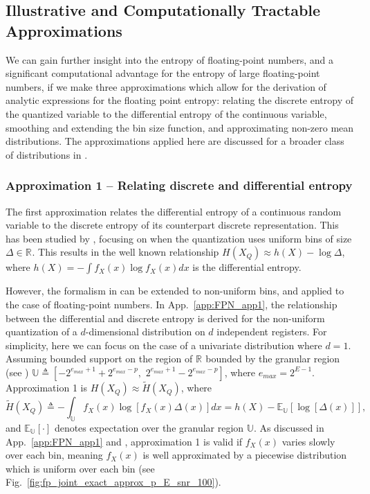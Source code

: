 \documentclass[12pt,onecolumn, margin=1in]{IEEEtran}
\newcommand{\R}[1]{\mathbb{R}^{#1}}
\newcommand{\Esub}[2]{\mathbb{E}_{#2}\left[ #1 \right]}
\begin{document}
\subsection{Illustrative and Computationally Tractable Approximations}\label{sec:illustrative_approx}

We can gain further insight into the entropy of floating-point numbers, and a significant computational advantage for the entropy of large floating-point numbers, if we make three approximations which allow for the derivation of analytic expressions for the floating point entropy: relating the discrete entropy of the quantized variable to the differential entropy of the continuous variable, smoothing and extending the bin size function, and approximating non-zero mean distributions. The approximations applied here are discussed for a broader class of distributions in \cite{daniels2026entropyfloatingpointnumbers}.

\subsubsection*{Approximation 1 -- Relating discrete and differential entropy}

The first approximation relates the differential entropy of a continuous random variable to the discrete entropy of its counterpart discrete representation. This has been studied by \cite{CoverThomas, renyi_dimension_1959, jaynes_information_1962, Jaynes1968-limiting, linder_asymptotic_1994, gish_asymptotically_1968, kostina_data_2017}, focusing on when the quantization uses uniform bins of size $\Delta \in \R{}$. This results in the well known relationship $H(X_Q) \approx h(X) - \log \Delta$, where $h(X) = - \int f_X(x) \log f_X(x) dx$ is the differential entropy. 

However, the formalism in \cite{kostina_data_2017} can be extended to non-uniform bins, and applied to the case of floating-point numbers. In App.~\ref{app:FPN_app1}, the relationship between the differential and discrete entropy is derived for the non-uniform quantization of a $d$-dimensional distribution on $d$ independent registers. For simplicity, here we can focus on the case of a univariate distribution where $d=1$. Assuming bounded support on the region of $\R{}$ bounded by the granular region (see \cite{GrayNeuhoff1998Quantization}) $\mathbb{U} \triangleq [-2^{e_{max} + 1} + 2^{e_{max} - p}, \,\, 2^{e_{max} + 1} - 2^{e_{max} - p}]$, where $e_{max} = 2^{E-1}$. Approximation 1 is $H(X_Q) \approx \tilde H(X_Q)$, where
\begin{equation}
    \label{eq:diff_approx}
    \tilde H(X_Q) \triangleq -\int_\mathbb{U} f_X(x) \log [f_X(x) \Delta(x)] dx = h(X) - \Esub{\log[\Delta(x)]}{\mathbb{U}},
\end{equation}
and $\Esub{\cdot}{\mathbb{U}}$ denotes expectation over the granular region $\mathbb{U}$. As discussed in App.~\ref{app:FPN_app1} and \cite{kostina_data_2017}, approximation 1 is valid if $f_X(x)$ varies slowly over each bin, meaning $f_{X}(x)$ is well approximated by a piecewise distribution which is uniform over each bin (see Fig.~\ref{fig:fp_joint_exact_approx_p_E_snr_100}). 
\end{document}
